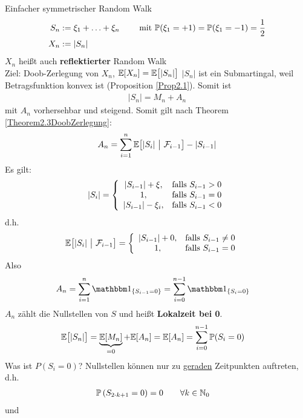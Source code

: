 \begin{beisp}
Einfacher symmetrischer Random Walk 
\begin{align*}
S_n&:=\xi_1+\ldots+\xi_n \qquad\mit\P(\xi_1=+1)=\P(\xi_1=-1)=\frac{1}{2}\\
X_n&:=|S_n|
\end{align*}
$X_n$ heißt auch \textbf{reflektierter} Random Walk\\
Ziel: Doob-Zerlegung von $X_n$, $\E[X_n]=\E\big[|S_n|\big]$
$|S_n|$ ist ein Submartingal, weil Betragsfunktion konvex ist (Proposition \ref{Prop2.1}). Somit ist
\begin{align*}
|S_n|=M_n+A_n
\end{align*}
mit $A_n$ vorhersehbar und steigend. Somit gilt nach Theorem \ref{Theorem2.3DoobZerlegung}:
\begin{align*}
A_n=\sum\limits_{i=1}^n \E\big[|S_i|~\big|~\F_{i-1}\big]-|S_{i-1}|
\end{align*}
Es gilt:
\begin{align*}
|S_i|=\left\lbrace\begin{array}{cl}
|S_{i-1}|+\xi, & \falls S_{i-1}>0\\
1, &\falls S_{i-1}=0\\
|S_{i-1}|-\xi_i, &\falls S_{i-1}<0
\end{array}\right.
\end{align*}
d.h.
\begin{align*}
\E\big[|S_i|~\big|~\F_{i-1}\big]&=\left\lbrace\begin{array}{cl}
|S_{i-1}|+0, &\falls S_{i-1}\neq0\\
1, &\falls S_{i-1}=0
\end{array}\right.
\end{align*}
Also
\begin{align*}
A_n&=\sum\limits_{i=1}^n\indi_{\lbrace S_{i-1}=0\rbrace}=\sum\limits_{i=0}^{n-1}\indi_{\lbrace S_i=0\rbrace}
\end{align*}
$A_n$ zählt die Nullstellen von $S$ und heißt \textbf{Lokalzeit bei 0}.
\begin{align*}
\E\big[|S_n|\big]&=
\underbrace{\E[M_n]}_{=0}+\E[A_n]
=\E[A_n]
=\sum\limits_{i=0}^{n-1}\P(S_i=0)
\end{align*}
Was ist $P(S_i=0)$? Nullstellen können nur zu \ul{geraden} Zeitpunkten auftreten, d.h.
\begin{align*}
\P\left(S_{2\cdot k+1}=0\right)&=0\qquad\forall k\in\N_0
\end{align*}
und
\begin{align*}

\end{align*}
\end{beisp}
